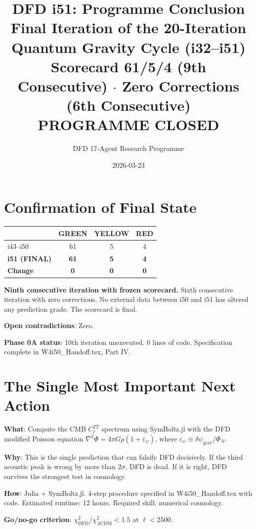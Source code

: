\documentclass[11pt,a4paper]{article}
\title{DFD i51: Programme Conclusion\\[6pt]
\large Final Iteration of the 20-Iteration Quantum Gravity Cycle (i32--i51)\\[6pt]
\normalsize Scorecard 61/5/4 (9th Consecutive) $\cdot$ Zero Corrections (6th Consecutive)\\[3pt]
\normalsize \textbf{PROGRAMME CLOSED}}
\author{DFD 17-Agent Research Programme}
\date{2026-03-23}
\newcommand{\GREEN}{\textcolor{dfdgreen}{\textbf{GREEN}}}
\newcommand{\YELLOW}{\textcolor{dfdyellow}{\textbf{YELLOW}}}
\newcommand{\RED}{\textcolor{dfdred}{\textbf{RED}}}
\begin{document}
\maketitle


\section{Confirmation of Final State}

\begin{center}
\begin{tabular}{lccc}
\toprule
& \textbf{\GREEN} & \textbf{\YELLOW} & \textbf{\RED} \\
\midrule
i43--i50 & 61 & 5 & 4 \\
\textbf{i51 (FINAL)} & \textbf{61} & \textbf{5} & \textbf{4} \\
\textbf{Change} & \textbf{0} & \textbf{0} & \textbf{0} \\
\bottomrule
\end{tabular}
\end{center}

\textbf{Ninth consecutive iteration with frozen scorecard.} Sixth consecutive iteration with zero corrections. No external data between i50 and i51 has altered any prediction grade. The scorecard is final.

\textbf{Open contradictions}: Zero.

\textbf{Phase 0A status}: 10th iteration unexecuted. 0 lines of code. Specification complete in W4i50\_Handoff.tex, Part IV.


\section{The Single Most Important Next Action}

\begin{tcolorbox}[colback=yellow!5!white, colframe=yellow!60!black,
  title={Phase 0A: CMB Power Spectrum Under DFD Gravity}]

\textbf{What}: Compute the CMB $C_\ell^{TT}$ spectrum using SymBoltz.jl with the DFD modified Poisson equation $\nabla^2\Phi = 4\pi G\rho(1 + \varepsilon_\psi)$, where $\varepsilon_\psi \equiv \delta\psi_\text{grav}/\Phi_N$.

\textbf{Why}: This is the single prediction that can falsify DFD decisively. If the third acoustic peak is wrong by more than $2\sigma$, DFD is dead. If it is right, DFD survives the strongest test in cosmology.

\textbf{How}: Julia + SymBoltz.jl. 4-step procedure specified in W4i50\_Handoff.tex with code. Estimated runtime: 12 hours. Required skill: numerical cosmology.

\textbf{Go/no-go criterion}: $\chi^2_\text{DFD} / \chi^2_{\Lambda\text{CDM}} < 1.5$ at $\ell < 2500$.
\end{tcolorbox}
\end{document}
